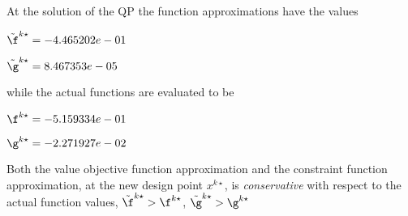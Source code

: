 At the solution of the QP the function approximations have the values

$\tilde \f^{k\star} = -4.465202e-01$

$\tilde \g^{k\star} =  8.467353e-05$

\bigskip
while the actual functions are evaluated to be

$\f^{k\star} = -5.159334e-01$

$\g^{k\star} = -2.271927e-02$

\bigskip 
 Both the value objective function approximation                     and the constraint function approximation, at the new design point                     $x^{k\star}$, is \emph{conservative} with respect to the actual function                     values, $\tilde {\f}^{k\star} > {\f}^{k\star}$,                     $\tilde {\g}^{k\star} > {\g}^{k\star}$ 

